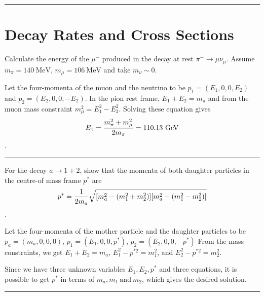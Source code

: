 \noindent\rule{7in}{2.8pt}
\section{Decay Rates and Cross Sections}

\begin{problem}{3.1}
Calculate the energy of the $\mu^-$ produced in the decay at rest $\pi^- \rightarrow \mu\bar{\nu}_{\mu}$.
Assume $m_{\pi} = \mathrm{140 \ MeV}$, $m_{\mu} = \mathrm{106 \ MeV}$ and take $m_{\nu} \sim 0$.
\end{problem}

\begin{solution}
Let the four-momenta of the muon and the neutrino to be $p_1 = (E_1, 0, 0, E_2)$ and $p_2 = (E_2, 0, 0, -E_2)$.
In the pion rest frame, $E_1 + E_2 = m_{\pi}$ and from the muon mass constraint $m_{\mu}^2 = E_1^2 - E_2^2$.
Solving these equation gives 
$$E_1 = {m_{\pi}^2 + m_{\mu}^2 \over 2m_{\pi}} = \mathrm{110.13 \ GeV}$$.

\end{solution} 
\noindent\rule{7in}{1.5pt}


\begin{problem}{3.2}
For the decay $a \rightarrow 1 + 2$, show that the momenta of both daughter particles
in the centre-of mass frame $p^*$ are
$$p^* = {1 \over 2m_a}\sqrt{[m_a^2 - (m_1^2 + m_2^2)][m_a^2 - (m_1^2 - m_2^2)]}$$.
\end{problem}

\begin{solution}
Let the four-momenta of the mother particle and the daughter particles to be
$p_a = (m_a, 0, 0, 0)$, $p_1 = (E_1, 0, 0, p^*)$, $p_2 = (E_2, 0, 0, -p^*)$
From the mass constraints, we get $E_1 + E_2 = m_a$, $E_1^2 - p^{*2} = m_1^2$, and 
$E_2^2 - p^{*2} = m_2^2$.

Since we have three unknown variables $E_1, E_2, p^*$ and three equations,
it is possible to get $p^*$ in terms of $m_a, m_1 \ \mathrm{and} \ m_2$, which gives
the desired solution.

\end{solution} 
\noindent\rule{7in}{1.5pt}


